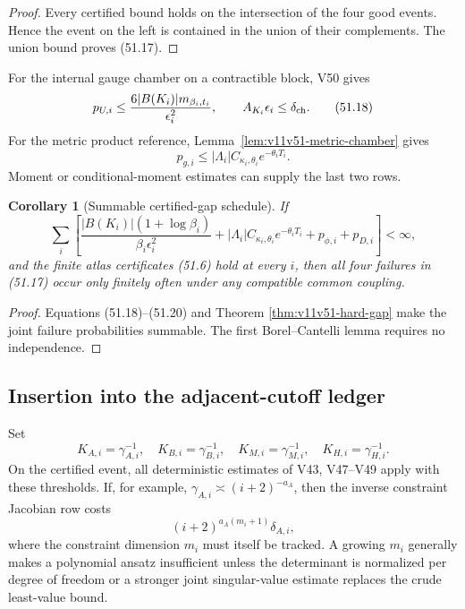 \documentclass[11pt]{article}
\newtheorem{corollary}[theorem]{Corollary}
\begin{document}
\begin{proof}
Every certified bound holds on the intersection of the four good
events.  Hence the event on the left is contained in the union of
their complements.  The union bound proves (51.17).
\end{proof}

For the internal gauge chamber on a contractible block, V50 gives
\[
 p_{U,i}\le
 \frac{6|B(K_i)|m_{\beta_i,t_i}}{\epsilon_i^2},
 \qquad A_{K_i}\epsilon_i\le\delta_{\rm ch}.                  \tag{51.18}
\]
For the metric product reference, Lemma~\ref{lem:v11v51-metric-chamber}
gives
\[
 p_{g,i}\le|\Lambda_i|C_{\kappa_i,\theta_i}
                                  e^{-\theta_iT_i}.           \tag{51.19}
\]
Moment or conditional-moment estimates can supply the last two rows.

\begin{corollary}[Summable certified-gap schedule]
\label{cor:v11v51-schedule}
If
\[
 \sum_i\left[
 \frac{|B(K_i)|(1+\log\beta_i)}
      {\beta_i\epsilon_i^2}
 +|\Lambda_i|C_{\kappa_i,\theta_i}e^{-\theta_iT_i}
 +p_{\phi,i}+p_{D,i}\right]<\infty,                           \tag{51.20}
\]
and the finite atlas certificates (51.6) hold at every \(i\), then all
four failures in (51.17) occur only finitely often under any compatible
common coupling.
\end{corollary}

\begin{proof}
Equations (51.18)--(51.20) and Theorem
\ref{thm:v11v51-hard-gap} make the joint failure probabilities
summable.  The first Borel--Cantelli lemma requires no independence.
\end{proof}

\subsection{Insertion into the adjacent-cutoff ledger}

Set
\[
 K_{A,i}=\gamma_{A,i}^{-1},\quad
 K_{B,i}=\gamma_{B,i}^{-1},\quad
 K_{M,i}=\gamma_{M,i}^{-1},\quad
 K_{H,i}=\gamma_{H,i}^{-1}.                                  \tag{51.21}
\]
On the certified event, all deterministic estimates of V43, V47--V49
apply with these thresholds.  If, for example,
\(\gamma_{A,i}\asymp(i+2)^{-a_A}\), then the inverse constraint
Jacobian row costs
\[
                         (i+2)^{a_A(m_i+1)}\delta_{A,i},       \tag{51.22}
\]
where the constraint dimension \(m_i\) must itself be tracked.  A
growing \(m_i\) generally makes a polynomial ansatz insufficient unless
the determinant is normalized per degree of freedom or a stronger
joint singular-value estimate replaces the crude least-value bound.
\end{document}
